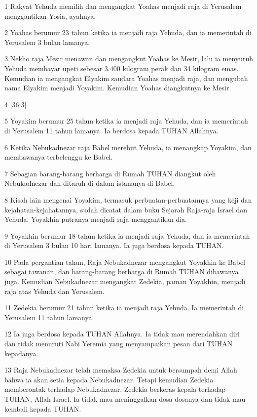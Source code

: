 \par 1 Rakyat Yehuda memilih dan mengangkat Yoahas menjadi raja di Yerusalem menggantikan Yosia, ayahnya.
\par 2 Yoahas berumur 23 tahun ketika ia menjadi raja Yehuda, dan ia memerintah di Yerusalem 3 bulan lamanya.
\par 3 Nekho raja Mesir menawan dan mengangkut Yoahas ke Mesir, lalu ia menyuruh Yehuda membayar upeti sebesar 3.400 kilogram perak dan 34 kilogram emas. Kemudian ia mengangkat Elyakim saudara Yoahas menjadi raja, dan mengubah nama Elyakim menjadi Yoyakim. Kemudian Yoahas diangkutnya ke Mesir.
\par 4 [36:3]
\par 5 Yoyakim berumur 25 tahun ketika ia menjadi raja Yehuda, dan ia memerintah di Yerusalem 11 tahun lamanya. Ia berdosa kepada TUHAN Allahnya.
\par 6 Ketika Nebukadnezar raja Babel merebut Yehuda, ia menangkap Yoyakim, dan membawanya terbelenggu ke Babel.
\par 7 Sebagian barang-barang berharga di Rumah TUHAN diangkut oleh Nebukadnezar dan ditaruh di dalam istananya di Babel.
\par 8 Kisah lain mengenai Yoyakim, termasuk perbuatan-perbuatannya yang keji dan kejahatan-kejahatannya, sudah dicatat dalam buku Sejarah Raja-raja Israel dan Yehuda. Yoyakhin putranya menjadi raja menggantikan dia.
\par 9 Yoyakhin berumur 18 tahun ketika ia menjadi raja Yehuda, dan ia memerintah di Yerusalem 3 bulan 10 hari lamanya. Ia juga berdosa kepada TUHAN.
\par 10 Pada pergantian tahun, Raja Nebukadnezar mengangkut Yoyakhin ke Babel sebagai tawanan, dan barang-barang berharga di Rumah TUHAN dibawanya juga. Kemudian Nebukadnezar mengangkat Zedekia, paman Yoyakhin, menjadi raja atas Yehuda dan Yerusalem.
\par 11 Zedekia berumur 21 tahun ketika ia menjadi raja Yehuda. Ia memerintah di Yerusalem 11 tahun lamanya.
\par 12 Ia juga berdosa kepada TUHAN Allahnya. Ia tidak mau merendahkan diri dan tidak menuruti Nabi Yeremia yang menyampaikan pesan dari TUHAN kepadanya.
\par 13 Raja Nebukadnezar telah memaksa Zedekia untuk bersumpah demi Allah bahwa ia akan setia kepada Nebukadnezar. Tetapi kemudian Zedekia memberontak terhadap Nebukadnezar. Zedekia berkeras kepala terhadap TUHAN, Allah Israel. Ia tidak mau meninggalkan dosa-dosanya dan tidak mau kembali kepada TUHAN.
